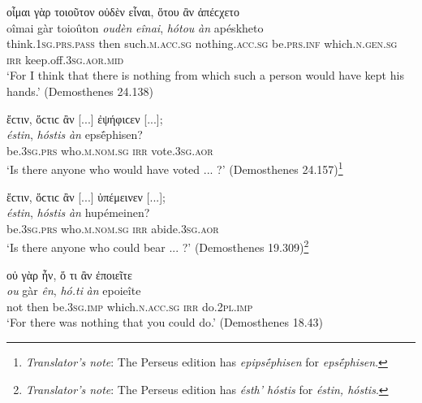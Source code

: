 \begin{exe}
\ex οἶμαι γὰρ τοιοῦτον οὐδὲν εἶναι, ὅτου ἂν ἀπέϲχετο\\
\gll oîmai gàr toioûton \emph{oudèn} \emph{eînai}, \emph{hótou} \emph{àn} apéskheto\\
think.\textsc{1sg.prs.pass} then such.\textsc{m.acc.sg} nothing.\textsc{acc.sg} be.\textsc{prs.inf} which.\textsc{n.gen.sg} \textsc{irr} keep.off.\textsc{3sg.aor.mid}\\
\trans `For I think that there is nothing from which such a person would have kept his hands.' (Demosthenes 24.138)
\label{relan6}
\end{exe}

\begin{exe}
\ex ἔϲτιν, ὅϲτιϲ ἂν {[}...{]} ἐψήφιϲεν {[}...{]};\\
\gll \emph{éstin}, \emph{hóstis} \emph{àn} epsḗphisen?\\
be.\textsc{3sg.prs} who.\textsc{m.nom.sg} \textsc{irr} vote.\textsc{3sg.aor}\\
\trans `Is there anyone who would have voted ... ?' (Demosthenes 24.157)\footnote{\emph{Translator's note}: The Perseus edition has \textit{epipsḗphisen} for \textit{epsḗphisen}.}
\label{relan7}
\end{exe}

\begin{exe}
\ex ἔϲτιν, ὅϲτιϲ ἂν {[}...{]} ὑπέμεινεν {[}...{]};\\
\gll \emph{éstin}, \emph{hóstis} \emph{àn} hupémeinen?\\
be.\textsc{3sg.prs} who.\textsc{m.nom.sg} \textsc{irr} abide.\textsc{3sg.aor}\\
\trans `Is there anyone who could bear ... ?' (Demosthenes 19.309)\footnote{\emph{Translator's note}: The Perseus edition has \textit{ésth' hóstis} for \textit{éstin, hóstis}.}
\label{relan8}
\end{exe}

\begin{exe}
\ex οὐ γὰρ ἦν, ὅ τι ἂν ἐποιεῖτε\\
\gll \emph{ou} gàr \emph{ên}, \emph{hó.ti} \emph{àn} epoieîte\\
not then be.\textsc{3sg.imp} which.\textsc{n.acc.sg} \textsc{irr} do.\textsc{2pl.imp}\\
\trans `For there was nothing that you could do.' (Demosthenes 18.43)
\label{relan9}
\end{exe}

